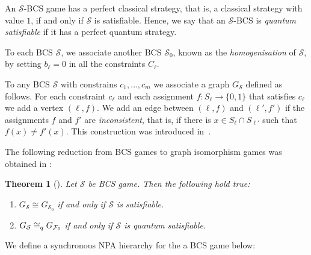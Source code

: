 \documentclass[11pt,a4paper]{article}
\theoremstyle{plain}
\newtheorem{thm}{Theorem}[section]
\theoremstyle{remark}
\theoremstyle{definition}
\def\calS{{\mathcal S}} \def\calT{{\mathcal T}} \def\calU{{\mathcal U}}
\begin{document}
An $\calS$-BCS game has a perfect classical strategy, that is, a classical strategy with value $1$, if and only if $\calS$ is satisfiable.
Hence, we say that an $\calS$-BCS is \emph{quantum satisfiable} if it has a perfect quantum strategy.

To each BCS $\calS$, we associate another BCS $\calS_0$, known as the \emph{homogenisation} of $\calS$, by setting $b_{\ell} = 0$ in all the constraints $C_{\ell}$. 

To any BCS $\calS$ with constrains $c_1,\dots, c_m$ we associate a graph $G_\calS$ defined as follows.
For each constraint $c_\ell$ and each assignment $f\colon S_\ell \to \{0,1\}$ that satisfies $c_\ell$ we add a vertex $(\ell, f)$.
We add an edge between $(\ell, f)$ and $(\ell', f')$ if the assignments $f$ and $f'$ are \emph{inconsistent}, that is, if there is $x \in S_\ell \cap S_{\ell'}$ such that $f(x) \neq f'(x)$.
This construction was introduced in~\cite{ATSERIAS2019289}.

The following reduction from BCS games to graph isomorphism games was obtained in \cite{ATSERIAS2019289}: 

\begin{thm}[{\cite[Theorem 6.2, Theorem 7.1]{ATSERIAS2019289}}]
    Let $\calS$ be BCS game. Then the following hold true: 
    \begin{enumerate}[label = (\roman*)]
        \item $G_{\calS} \cong G_{\calS_0}$ if and only if $\calS$ is satisfiable. 
        \item $G_{\calS} \cong_{q} G_{\calF_0}$ if and only if $\calS$ is quantum satisfiable. 
    \end{enumerate}
\end{thm}

We define a synchronous NPA hierarchy for the a BCS game below:
\end{document}
